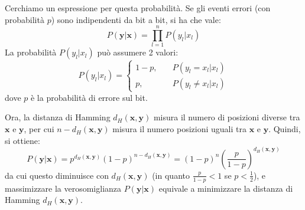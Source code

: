 \documentclass[a4paper,11pt]{article}
\begin{document}
Cerchiamo un espressione per questa probabilità. Se gli eventi errori (con probabilità $p$) sono indipendenti da bit a bit, si ha che vale:
$$
P(\mathbf{y} | \mathbf{x}) = \prod_{l = 1}^n P(y_l | x_l)
$$
La probabilità $P(y_l | x_l)$ può assumere 2 valori:
$$
P(y_l | x_l) =
\begin{cases}
	1 - p , & \quad P(y_l = x_l | x_l) \\
	p , & \quad P(y_l \neq x_l | x_l)
\end{cases}
$$
dove $p$ è la probabilità di errore sul bit.

Ora, la distanza di Hamming $d_H(\mathbf{x}, \mathbf{y})$ misura il numero di posizioni diverse tra $\mathbf{x}$ e $\mathbf{y}$, per cui $n - d_H(\mathbf{x}, \mathbf{y})$ misura il numero posizioni uguali tra $\mathbf{x}$ e $\mathbf{y}$. Quindi, si ottiene:
$$
P(\mathbf{y} | \mathbf{x}) = p^{d_H(\mathbf{x}, \mathbf{y})} (1 - p)^{n - d_H(\mathbf{x}, \mathbf{y})} = (1 - p)^n \left( \frac{p}{1 - p} \right)^{d_H(\mathbf{x}, \mathbf{y})}
$$
da cui questo diminuisce con $d_H(\mathbf{x}, \mathbf{y})$ (in quanto $\frac{p}{1- p} < 1$ se $p < \frac{1}{2}$), e massimizzare la verosomiglianza $P(\mathbf{y} | \mathbf{x})$ equivale a minimizzare la distanza di Hamming $d_H(\mathbf{x}, \mathbf{y})$.
\end{document}
